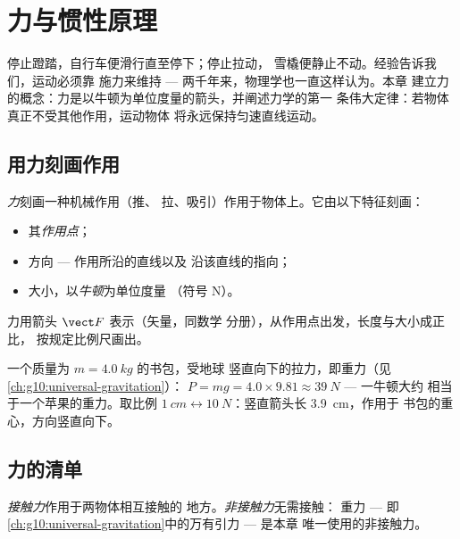 \chapter{力与惯性原理}\label{ch:g10:inertia}

停止蹬踏，自行车便滑行直至停下；停止拉动，
雪橇便静止不动。经验告诉我们，运动必须靠
施力来维持 --- 两千年来，物理学也一直这样认为。本章
建立力的概念：力是以牛顿为单位度量的箭头，并阐述力学的第一
条伟大定律：若物体真正不受其他作用，运动物体
将永远保持匀速直线运动。

\section{用力刻画作用}

\begin{definition}[力]\label{def:g10:inertia:force}
\emph{力}刻画一种机械作用（推、
拉、吸引）作用于物体上。它由以下特征刻画：
\begin{itemize}
  \item 其\emph{作用点}；
  \item 方向 --- 作用所沿的直线以及
        沿该直线的指向；
  \item 大小，以\emph{牛顿}为单位度量
        （符号 \unit{N}）。
\end{itemize}
力用箭头 $\vect F$ 表示（矢量，同数学
分册），从作用点出发，长度与大小成正比，
按规定比例尺画出。
\end{definition}

\begin{example}[书包的重力]\label{ex:g10:inertia:schoolbag}
一个质量为 $m = \qty{4.0}{kg}$ 的书包，受地球
竖直向下的拉力，即重力（见\cref{ch:g10:universal-gravitation}）：
$P = mg = 4.0 \times 9.81 \approx \qty{39}{N}$ --- 一牛顿大约
相当于一个苹果的重力。取比例 $\qty{1}{cm} \leftrightarrow
\qty{10}{N}$：竖直箭头长 \qty{3.9}{cm}，作用于
书包的重心，方向竖直向下。
\end{example}

\section{力的清单}

\begin{definition}[接触力与非接触力]\label{def:g10:inertia:contact}
\emph{接触力}作用于两物体相互接触的
地方。\emph{非接触力}无需接触：
重力 --- 即
\cref{ch:g10:universal-gravitation}中的万有引力 --- 是本章
唯一使用的非接触力。
\end{definition}

